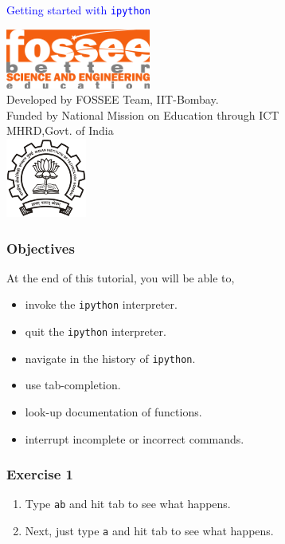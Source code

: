 \documentclass[presentation]{beamer}
\title{}
\author{FOSSEE}
\date{}
\begin{document}
\begin{frame}

\begin{center}
\vspace{12pt}
\textcolor{blue}{\huge Getting started with \texttt{ipython}}
\end{center}
\vspace{18pt}
\begin{center}
\vspace{10pt}
\includegraphics[scale=0.95]{../images/fossee-logo.png}\\
\vspace{5pt}
\scriptsize Developed by FOSSEE Team, IIT-Bombay. \\ 
\scriptsize Funded by National Mission on Education through ICT\\
\scriptsize  MHRD,Govt. of India\\
\includegraphics[scale=0.30]{../images/iitb-logo.png}\\
\end{center}
\end{frame}
\begin{frame}
\frametitle{Objectives}
\label{sec-2}

  At the end of this tutorial, you will be able to, 

\begin{itemize}
\item invoke the \verb~ipython~ interpreter.
\item quit the \verb~ipython~ interpreter.
\item navigate in the history of \verb~ipython~.
\item use tab-completion.
\item look-up documentation of functions.
\item interrupt incomplete or incorrect commands.
\end{itemize}
\end{frame}
\begin{frame}
\frametitle{Exercise 1}
\label{sec-3}


\begin{enumerate}
\item Type \texttt{ab} and hit tab to see what happens.
\item Next, just type \texttt{a} and hit tab to see what happens.
\end{enumerate}
\end{frame}
\end{document}
